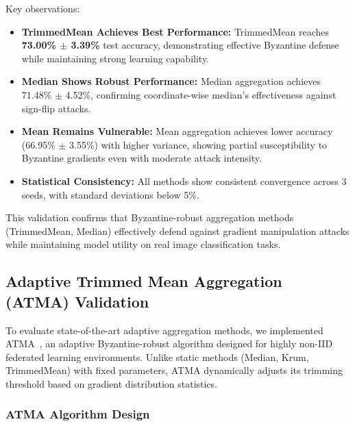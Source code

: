 \documentclass{ieeeaccess}
\begin{document}
Key observations:
\begin{itemize}
    \item \textbf{TrimmedMean Achieves Best Performance:} TrimmedMean reaches \textbf{73.00\% $\pm$ 3.39\%} test accuracy, demonstrating effective Byzantine defense while maintaining strong learning capability.
    
    \item \textbf{Median Shows Robust Performance:} Median aggregation achieves 71.48\% $\pm$ 4.52\%, confirming coordinate-wise median's effectiveness against sign-flip attacks.
    
    \item \textbf{Mean Remains Vulnerable:} Mean aggregation achieves lower accuracy (66.95\% $\pm$ 3.55\%) with higher variance, showing partial susceptibility to Byzantine gradients even with moderate attack intensity.
    
    \item \textbf{Statistical Consistency:} All methods show consistent convergence across 3 seeds, with standard deviations below 5\%.
\end{itemize}

This validation confirms that Byzantine-robust aggregation methods (TrimmedMean, Median) effectively defend against gradient manipulation attacks while maintaining model utility on real image classification tasks.

\subsection{Adaptive Trimmed Mean Aggregation (ATMA) Validation}

To evaluate state-of-the-art adaptive aggregation methods, we implemented ATMA~\cite{kalibbala2025atma}, an adaptive Byzantine-robust algorithm designed for highly non-IID federated learning environments. Unlike static methods (Median, Krum, TrimmedMean) with fixed parameters, ATMA dynamically adjusts its trimming threshold based on gradient distribution statistics.

\subsubsection{ATMA Algorithm Design}
\end{document}
